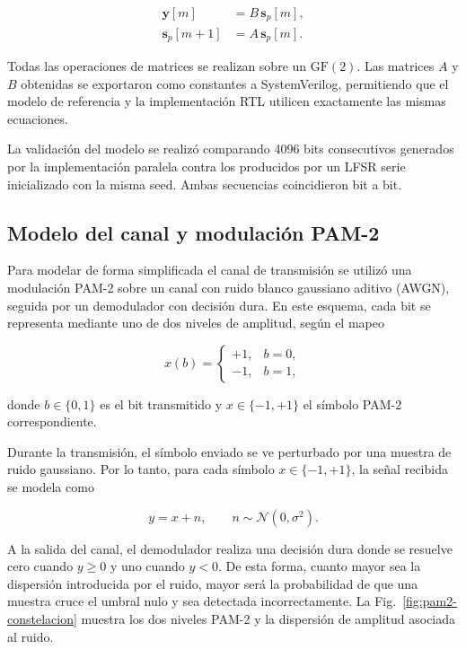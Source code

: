 \documentclass[10pt,a4paper]{article}
\begin{document}
\begin{equation}
    \boxed{
    \begin{aligned}
        \mathbf{y}[m]       &= B\,\mathbf{s}_{p}[m], \\
        \mathbf{s}_{p}[m+1] &= A\,\mathbf{s}_{p}[m].
    \end{aligned}}
    \label{eq:prbs-generador-paralelo}
\end{equation}

Todas las operaciones de matrices se realizan sobre un $\mathrm{GF}(2)$.
Las matrices $A$ y $B$ obtenidas se exportaron como constantes a
SystemVerilog,  permitiendo que el modelo de referencia y la
implementación RTL utilicen exactamente las mismas ecuaciones.

La validación del modelo se realizó comparando 4096 bits consecutivos
generados por la implementación paralela contra los producidos por un LFSR
serie inicializado con la misma seed. Ambas secuencias coincidieron bit a
bit.

\subsection{Modelo del canal y modulación PAM-2}

Para modelar de forma simplificada el canal de transmisión se utilizó una
modulación PAM-2 sobre un canal con ruido blanco gaussiano aditivo (AWGN),
seguida por un demodulador con decisión dura. En este esquema, cada bit se
representa mediante uno de dos niveles de amplitud, según el mapeo

\begin{equation}
    x(b)=
    \begin{cases}
        +1, & b=0,\\
        -1, & b=1,
    \end{cases}
    \label{eq:pam2-mapping}
\end{equation}

donde $b\in\{0,1\}$ es el bit transmitido y $x\in\{-1,+1\}$ el símbolo PAM-2
correspondiente.

Durante la transmisión, el símbolo enviado se ve perturbado por una muestra
de ruido gaussiano. Por lo tanto, para cada símbolo $x\in\{-1,+1\}$, 
la señal recibida se modela como

\begin{equation}
    y=x+n,
    \qquad
    n\sim\mathcal{N}(0,\sigma^2).
\end{equation}

A la salida del canal, el demodulador realiza una decisión dura donde se 
resuelve cero cuando $y\geq0$ y uno cuando $y<0$. De esta forma, cuanto 
mayor sea la dispersión introducida por el ruido, mayor será la probabilidad 
de que una muestra cruce el umbral nulo y sea detectada incorrectamente. 
La Fig.~\ref{fig:pam2-constelacion} muestra los dos niveles PAM-2 y la 
dispersión de amplitud asociada al ruido.
\end{document}
